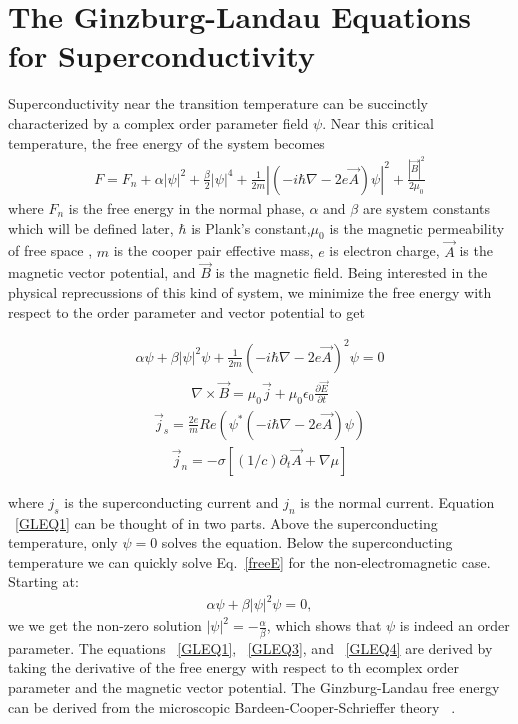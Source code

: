 \section{The Ginzburg-Landau Equations for Superconductivity}
Superconductivity near the transition temperature can be succinctly characterized by a complex order parameter field $\psi$. Near this critical temperature, the free energy of the system becomes
\begin{eqnarray}
F = F_n + \alpha |\psi|^2 + \frac {\beta} {2} |\psi|^4 + \frac {1} {2m} |(-i \hbar \nabla - 2 e \overrightarrow A) \psi|^2 + \frac {|\overrightarrow B |^2} {2 \mu_0}
\label{freeE}
\end{eqnarray}
where $F_n$ is the free energy in the normal phase, $\alpha$ and $\beta$ are system constants which will be defined later, $\hbar$ is Plank's constant,$\mu_0$ is the magnetic permeability of free space , $m$ is the cooper pair effective mass, $e$ is electron charge, $\overrightarrow A$ is the magnetic vector potential, and $\overrightarrow B$ is the magnetic field. Being interested in the physical reprecussions of this kind of system, we minimize the free energy with respect to the order parameter and vector potential to get

\begin{eqnarray}
\alpha \psi + \beta |\psi|^2 \psi + \frac {1} {2m} (-i \hbar \nabla - 2 e \overrightarrow A)^2 \psi = 0
\label{GLEQ1}
\end{eqnarray}
\begin{eqnarray}
\nabla \times \overrightarrow B = \mu_0 \overrightarrow j + \mu_0 \epsilon_0 \frac {\partial \overrightarrow E } {\partial t}
\label{GLEQ2}
\end{eqnarray}
\begin{eqnarray}
\overrightarrow j_s = \frac {2e} {m} Re(\psi^* (-i \hbar \nabla - 2 e \overrightarrow A) \psi)
\label{GLEQ3}
\end{eqnarray}
\begin{eqnarray}
\overrightarrow j_n = -\sigma [(1/c) \partial_t \overrightarrow A + \nabla \mu]
\label{GLEQ4}
\end{eqnarray}

where $j_s$ is the superconducting current and $j_n$ is the normal current. Equation ~\ref{GLEQ1} can be thought of in two parts. Above the superconducting temperature, only $\psi = 0$ solves the equation. Below the superconducting temperature we can quickly solve Eq.~\ref{freeE} for the non-electromagnetic case. Starting at:
\begin{eqnarray}
\alpha \psi + \beta |\psi|^2 \psi = 0 ,
\label{noEM}
\end{eqnarray}
we we get the non-zero solution $|\psi|^2 = -\frac {\alpha} {\beta}$, which shows that $\psi$ is indeed an order parameter. The equations ~\ref{GLEQ1}, ~\ref{GLEQ3}, and ~\ref{GLEQ4} are derived by taking the derivative of the free energy with respect to th ecomplex order parameter and the magnetic vector potential. The Ginzburg-Landau free energy can be derived from the microscopic Bardeen-Cooper-Schrieffer theory ~\cite{Sadovskyy14}. 

